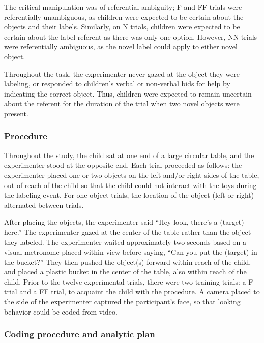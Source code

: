 \documentclass[a4paper,man,apacite,floatsintext]{apa6}
\begin{document}
The critical manipulation was of referential ambiguity; F and FF trials
were referentially unambiguous, as children were expected to be certain
about the objects and their labels. Similarly, on N trials, children
were expected to be certain about the label referent as there was only
one option. However, NN trials were referentially ambiguous, as the
novel label could apply to either novel object.

Throughout the task, the experimenter never gazed at the object they
were labeling, or responded to children's verbal or non-verbal bids for
help by indicating the correct object. Thus, children were expected to
remain uncertain about the referent for the duration of the trial when
two novel objects were present.

\subsubsection{Procedure}\label{procedure}

Throughout the study, the child sat at one end of a large circular
table, and the experimenter stood at the opposite end. Each trial
proceeded as follows: the experimenter placed one or two objects on the
left and/or right sides of the table, out of reach of the child so that
the child could not interact with the toys during the labeling event.
For one-object trials, the location of the object (left or right)
alternated between trials.

After placing the objects, the experimenter said ``Hey look, there's a
(target) here.'' The experimenter gazed at the center of the table
rather than the object they labeled. The experimenter waited
approximately two seconds based on a visual metronome placed within view
before saying, ``Can you put the (target) in the bucket?'' They then
pushed the object(s) forward within reach of the child, and placed a
plastic bucket in the center of the table, also within reach of the
child. Prior to the twelve experimental trials, there were two training
trials: a F trial and a FF trial, to acquaint the child with the
procedure. A camera placed to the side of the experimenter captured the
participant's face, so that looking behavior could be coded from video.

\subsubsection{Coding procedure and analytic
plan}\label{coding-procedure-and-analytic-plan}
\end{document}
